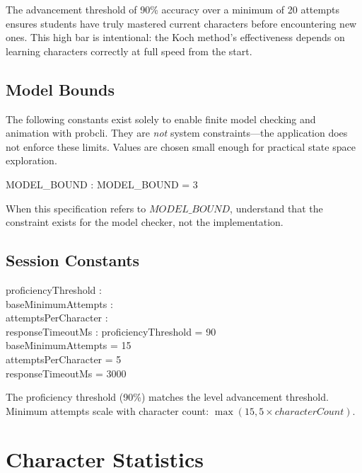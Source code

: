 \documentclass[a4paper,10pt,fleqn]{article}
\begin{document}
The advancement threshold of 90\% accuracy over a minimum of 20 attempts ensures
students have truly mastered current characters before encountering new ones.
This high bar is intentional: the Koch method's effectiveness depends on
learning characters correctly at full speed from the start.

\subsection{Model Bounds}

The following constants exist solely to enable finite model checking and animation
with probcli. They are \emph{not} system constraints---the application does not
enforce these limits. Values are chosen small enough for practical state space
exploration.

\begin{axdef}
MODEL\_BOUND : \nat
\where
MODEL\_BOUND = 3
\end{axdef}

When this specification refers to $MODEL\_BOUND$, understand that the constraint
exists for the model checker, not the implementation.

\subsection{Session Constants}

\begin{axdef}
proficiencyThreshold : \nat \\
baseMinimumAttempts : \nat \\
attemptsPerCharacter : \nat \\
responseTimeoutMs : \nat
\where
proficiencyThreshold = 90 \\
baseMinimumAttempts = 15 \\
attemptsPerCharacter = 5 \\
responseTimeoutMs = 3000
\end{axdef}

The proficiency threshold (90\%) matches the level advancement threshold.
Minimum attempts scale with character count: $\max(15, 5 \times characterCount)$.

\section{Character Statistics}
\end{document}
